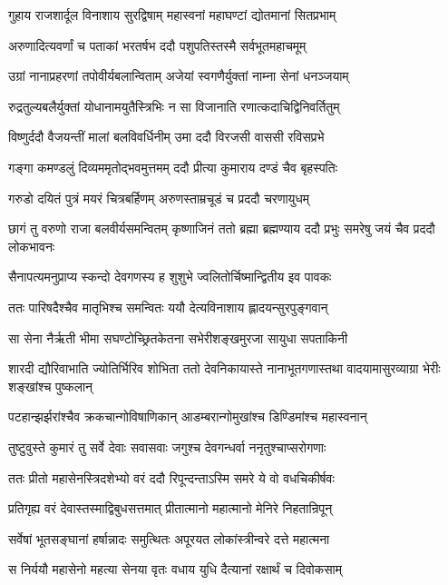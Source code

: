\twolineshloka
{गुहाय राजशार्दूल विनाशाय सुरद्विषाम्}
{महास्वनां महाघण्टां द्योतमानां सितप्रभाम्}


\twolineshloka
{अरुणादित्यवर्णां च पताकां भरतर्षभ}
{ददौ पशुपतिस्तस्मै सर्वभूतमहाचमूम्}


\twolineshloka
{उग्रां नानाप्रहरणां तपोवीर्यबलान्विताम्}
{अजेयां स्वगणैर्युक्तां नाम्ना सेनां धनञ्जयाम्}


\twolineshloka
{रुद्रतुल्यबलैर्युक्तां योधानामयुतैस्त्रिभिः}
{न सा विजानाति रणात्कदाचिद्विनिवर्तितुम्}


\twolineshloka
{विष्णुर्ददौ वैजयन्तीं मालां बलविवर्धिनीम्}
{उमा ददौ विरजसी वाससी रविसप्रभे}


\twolineshloka
{गङ्गा कमण्डलुं दिव्यममृतोद्भवमुत्तमम्}
{ददौ प्रीत्या कुमाराय दण्डं चैव बृहस्पतिः}


\twolineshloka
{गरुडो दयितं पुत्रं मयरं चित्रबर्हिणम्}
{अरुणस्ताम्रचूडं च प्रददौ चरणायुधम्}


\threelineshloka
{छागं तु वरुणो राजा बलवीर्यसमन्वितम्}
{कृष्णाजिनं ततो ब्रह्मा ब्रह्मण्याय ददौ प्रभुः}
{समरेषु जयं चैव प्रददौ लोकभावनः}


\twolineshloka
{सैनापत्यमनुप्राप्य स्कन्दो देवगणस्य ह}
{शुशुभे ज्वलितोर्चिष्मान्द्वितीय इव पावकः}


\twolineshloka
{ततः पारिषदैश्चैव मातृभिश्च समन्वितः}
{ययौ देत्यविनाशाय ह्लादयन्सुरपुङ्गवान्}


\twolineshloka
{सा सेना नैर्ऋती भीमा सघण्टोच्छ्रितकेतना}
{सभेरीशङ्खमुरजा सायुधा सपताकिनी}


शारदी द्यौरिवाभाति ज्योतिर्भिरिव शोभिता
\twolineshloka
{ततो देवनिकायास्ते नानाभूतगणास्तथा}
{वादयामासुरव्याग्रा भेरीः शङ्खांश्च पुष्कलान्}


\twolineshloka
{पटहान्झर्झरांश्चैव क्रकचान्गोविषाणिकान्}
{आडम्बरान्गोमुखांश्च डिण्डिमांश्च महास्वनान्}


\twolineshloka
{तुष्टुवुस्ते कुमारं तु सर्वे देवाः सवासवाः}
{जगुश्च देवगन्धर्वा ननृतुश्चाप्सरोगणाः}


\twolineshloka
{ततः प्रीतो महासेनस्त्रिदशेभ्यो वरं ददौ}
{रिपून्दन्ताऽस्मि समरे ये वो वधचिकीर्षवः}


\twolineshloka
{प्रतिगृह्य वरं देवास्तस्माद्विबुधसत्तमात्}
{प्रीतात्मानो महात्मानो मेनिरे निहतान्रिपून्}


\twolineshloka
{सर्वेषां भूतसङ्घानां हर्षान्नादः समुत्थितः}
{अपूरयत लोकांस्त्रीन्वरे दत्ते महात्मना}


\twolineshloka
{स निर्ययौ महासेनो महत्या सेनया वृतः}
{वधाय युधि दैत्यानां रक्षार्थं च दिवोकसाम्}


